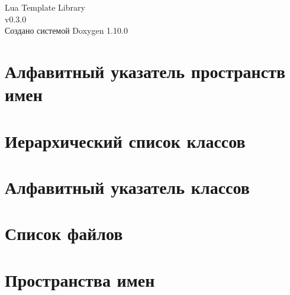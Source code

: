 \documentclass[twoside]{book}
\newcommand{\+}{\discretionary{\mbox{\scriptsize$\hookleftarrow$}}{}{}}
\newcommand{\clearemptydoublepage}{%
    \newpage{\pagestyle{empty}\cleardoublepage}%
  }
\begin{document}
  \raggedbottom
    \hypersetup{pageanchor=false,
                bookmarksnumbered=true,
                pdfencoding=unicode
               }
  \begin{titlepage}
  \vspace*{7cm}
  \begin{center}%
  {\Large Lua Template Library}\\
  [1ex]\large v0.\+3.\+0 \\
  \vspace*{1cm}
  {\large Создано системой Doxygen 1.10.0}\\
  \end{center}
  \end{titlepage}
  \clearemptydoublepage
  \tableofcontents
  \clearemptydoublepage
  \hypersetup{pageanchor=true}

\chapter{Алфавитный указатель пространств имен}

\chapter{Иерархический список классов}

\chapter{Алфавитный указатель классов}

\chapter{Список файлов}

\chapter{Пространства имен}


\end{document}
